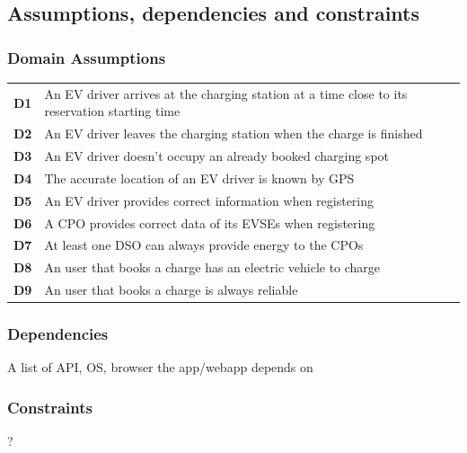 \subsection{Assumptions, dependencies and constraints}
\subsubsection*{Domain Assumptions}
\begin{table}[H]
      \begin{tabularx}{\textwidth}{cX}
            \toprule
            \textbf{D1} & An EV driver arrives at the charging station at a time close to its reservation starting time \\
            \textbf{D2} & An EV driver leaves the charging station when the charge is finished                          \\
            \textbf{D3} & An EV driver doesn't occupy an already booked charging spot                                   \\
            \textbf{D4} & The accurate location of an EV driver is known by GPS                                         \\
            \textbf{D5} & An EV driver provides correct information when registering                                    \\
            \textbf{D6} & A CPO provides correct data of its EVSEs when registering                                     \\
            \textbf{D7} & At least one DSO can always provide energy to the CPOs                                        \\
            \textbf{D8} & An user that books a charge has an electric vehicle to charge                                 \\
            \textbf{D9} & An user that books a charge is always reliable                                                \\ \bottomrule
      \end{tabularx}
\end{table}
\subsubsection*{Dependencies}
A list of API, OS, browser the app/webapp depends on
\subsubsection*{Constraints}
?
